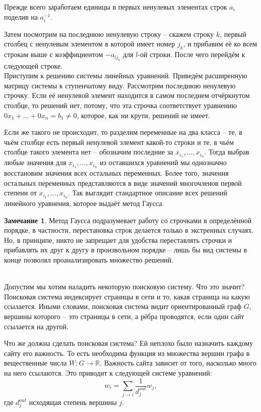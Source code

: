 \documentclass[10pt,a4paper,oneside]{book} %
\theoremstyle{definition}
\newtheorem*{rem}{Замечание}
\newcommand{\mb}[1]{\mathbb{#1}}
\def\exm{\noindent {\bf Примеры:}}
\def\rm{\begin{rem}}
\def\erm{\end{rem}}
\begin{document}
Прежде всего заработаем единицы в первых ненулевых элементах строк $a_i$ поделив на $a_i^{-1}$.

Затем посмотрим на последнюю ненулевую строку -- скажем строку $k$, первый  столбец с ненулевым элементом в которой имеет номер $j_k$, и прибавим её ко всем строкам выше с коэффициентом $-a_{lj_k}$ для $l$-ой строки. После чего перейдём к следующей строке.\\



Приступим к решению системы линейных уравнений. Приведём расширенную матрицу системы к ступенчатому виду. Рассмотрим последнюю ненулевую строчку. Если её ненулевой элемент находится в самом последнем отчёркнутом столбце, то решений нет, потому, что эта строчка соответствует уравнению $0x_1+\dots+0x_n=b_1\neq 0$, которое, как ни крути, решений не имеет.

Если же такого не происходит, то разделим переменные на два класса -- те, в чьём столбце есть первый ненулевой элемент какой-то строки и те, в чьём столбце такого элемента нет -- обозначим последние за $x_{i_1},\dots,x_{i_n}$. Тогда выбрав любые значения для $x_{i_1},\dots,x_{i_n}$ из оставшихся уравнений мы однозначно восстановим значения всех остальных переменных. Более того, значения остальных переменных представляются в виде значений многочленов первой степени от  $x_{i_1},\dots,x_{i_n}$. Так выглядит стандартное описание всех решений линейного уравнения, которое выдаёт метод Гаусса.

\rm Метод Гаусса подразумевает работу со строчками в определённой порядке, в частности, перестановка строк делается только в экстренных случаях. Но, в принципе, никто не запрещает для удобства переставлять строчки и прибавлять их друг к другу в произвольном порядке -- лишь бы вид системы в конце позволял проанализировать множество решений.
\erm

\exm\\
Допустим мы хотим наладить некоторую поисковую систему. Что это значит? Поисковая система индексирует страницы в сети и то, какая страница на какую ссылается. Иными словами, поисковая система видит ориентированный граф $G$, вершины которого -- это страницы в сети, а рёбра проводятся, если один сайт ссылается на другой.

Что же должна сделать поисковая система? Ей неплохо было назначить каждому сайту его важность. То есть необходима функция из множества вершин графа в вещественные числа  $W\colon G \to \mb R$. Важность сайта зависит от того, насколько много на него ссылаются. Это приводит  к следующей системе уравнений:
$$w_i=\sum_{j\to i} \frac{1}{d_j^{out}}w_j,$$
где $d_j^{out}$ исходящая степень вершины $j$.
\end{document}
